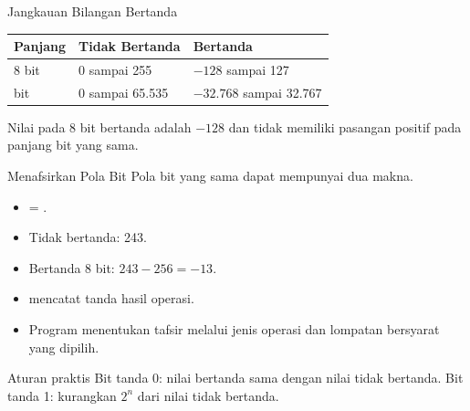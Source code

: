 \documentclass[aspectratio=169,11pt]{beamer}
\begin{document}
\begin{frame}{Jangkauan Bilangan Bertanda}
\small
\begin{center}
\begin{tabular}{@{}p{2.6cm}p{4.6cm}p{5.2cm}@{}}
    \toprule
    \textbf{Panjang} & \textbf{Tidak Bertanda} &
    \textbf{Bertanda} \\
    \midrule
    8 bit & 0 sampai 255 & $-128$ sampai 127 \\
    \addlinespace
    16 bit & 0 sampai 65.535 & $-32.768$ sampai 32.767 \\
    \bottomrule
\end{tabular}
\end{center}

\vspace{0.3em}
Nilai  pada 8 bit bertanda adalah $-128$ dan tidak
memiliki pasangan positif pada panjang bit yang sama.
\end{frame}

\begin{frame}{Menafsirkan Pola Bit}
\small
Pola bit yang sama dapat mempunyai dua makna.

\vspace{0.25em}
\begin{itemize}
    \item {} = .
    \item Tidak bertanda: 243.
    \item Bertanda 8 bit: $243 - 256 = -13$.
\end{itemize}

\vspace{0.25em}
\begin{itemize}
    \item {} mencatat tanda hasil operasi.
    \item Program menentukan tafsir melalui jenis operasi dan
          lompatan bersyarat yang dipilih.
\end{itemize}

\vspace{0.2em}
\begin{block}{Aturan praktis}
\small Bit tanda 0: nilai bertanda sama dengan nilai tidak bertanda.
Bit tanda 1: kurangkan $2^n$ dari nilai tidak bertanda.
\end{block}
\end{frame}
\end{document}
